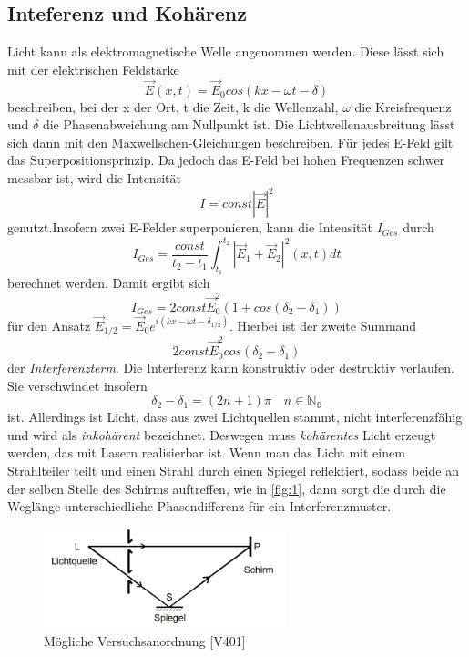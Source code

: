 \subsection{Inteferenz und Kohärenz}
Licht kann als elektromagnetische Welle angenommen werden. Diese lässt sich mit der elektrischen Feldstärke 
\begin{equation}
  \vec E(x,t)=\vec E_{0}cos(kx-\omega t-\delta) \nonumber
\end{equation}
beschreiben, bei der x der Ort, t die Zeit, k die Wellenzahl, $\omega$ die Kreisfrequenz und $\delta$ die Phasenabweichung am Nullpunkt ist. Die Lichtwellenausbreitung lässt sich dann mit den Maxwellschen-Gleichungen beschreiben. Für jedes E-Feld gilt das Superpositionsprinzip. Da jedoch das E-Feld bei hohen Frequenzen schwer messbar ist, wird die Intensität 
\begin{equation}
  I=const|\vec E|^2 \nonumber
\end{equation}
genutzt.Insofern zwei E-Felder superponieren, kann die Intensität $I_{Ges}$ durch
\begin{equation}
  I_{Ges}=\frac{const}{t_{2}-t_{1}} \int^{t_{2}}_{t_{1}} |\vec E_{1}+\vec E_{2}|^2 (x,t)dt \nonumber
\end{equation}
berechnet werden. Damit ergibt sich 
\begin{equation}
  I_{Ges}=2const\vec E_{0}^2 (1+cos(\delta_{2}-\delta_{1})) \nonumber
\end{equation}
für den Ansatz $\vec E_{1/2}=\vec E_{0}e^{i(kx-\omega t -\delta_{1/2})}$. Hierbei ist der zweite Summand
\begin{equation}
  2const\vec E_{0}^2 cos(\delta_{2}-\delta_{1}) \nonumber
\end{equation}
der \textit{Interferenzterm}.
Die Interferenz kann konstruktiv oder destruktiv verlaufen. Sie verschwindet insofern 
\begin{equation}
  \delta_{2}-\delta_{1}=(2n+1)\pi \quad n \in \mathds{N_{0}} \nonumber
\end{equation}
ist. Allerdings ist Licht, dass aus zwei Lichtquellen stammt, nicht interferenzfähig und wird als \textit{inkohärent} bezeichnet. Deswegen muss \textit{kohärentes} Licht erzeugt werden, das mit Lasern realisierbar ist.
Wenn man das Licht mit einem Strahlteiler teilt und einen Strahl durch einen Spiegel reflektiert, sodass beide an der selben Stelle des Schirms auftreffen, wie in \autoref{fig:1}, dann sorgt die durch die Weglänge unterschiedliche Phasendifferenz für ein Interferenzmuster.
\begin{figure}[H]
  \centering
  \includegraphics[width=7cm]{1}
  \caption{Mögliche Versuchsanordnung [V401]}
  \label{fig:1}
\end{figure}

